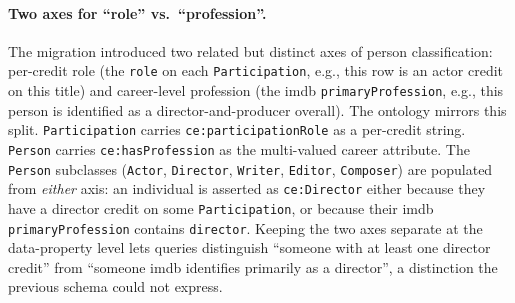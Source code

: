 \paragraph{Two axes for ``role'' vs.\ ``profession''.}
\label{sec:onto-two-axis-discussion}
The migration introduced two related but distinct axes of person classification: per-credit role (the \texttt{role} on each \texttt{Participation}, e.g., this row is an actor credit on this title) and career-level profession (the \ac{imdb} \texttt{primaryProfession}, e.g., this person is identified as a director-and-producer overall). The ontology mirrors this split. \texttt{Participation} carries \texttt{ce:participationRole} as a per-credit string. \texttt{Person} carries \texttt{ce:hasProfession} as the multi-valued career attribute. The \texttt{Person} subclasses (\texttt{Actor}, \texttt{Director}, \texttt{Writer}, \texttt{Editor}, \texttt{Composer}) are populated from \emph{either} axis: an individual is asserted as \texttt{ce:Director} either because they have a director credit on some \texttt{Participation}, or because their \ac{imdb} \texttt{primaryProfession} contains \texttt{director}. Keeping the two axes separate at the data-property level lets queries distinguish ``someone with at least one director credit'' from ``someone \ac{imdb} identifies primarily as a director'', a distinction the previous schema could not express.